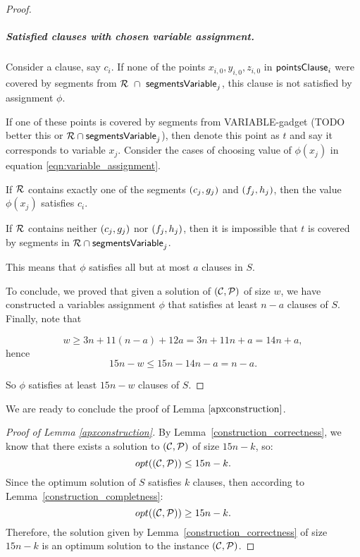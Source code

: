 \begin{proof}
\subparagraph{Satisfied clauses with chosen variable assignment.}

Consider a clause, say $c_i$. If none of
the points $x_{i,0}, y_{i,0}, z_{i,0}$ in $\mathsf{pointsClause}_i$ were covered by
segments from $\mathcal{R}~\cap~\mathsf{segmentsVariable}_{j}$,
this clause is not satisfied by assignment $\phi$.

If one of these points is covered by 
segments from VARIABLE-gadget (TODO better this or $\mathcal{R} \cap \mathsf{segmentsVariable}_{j}$),
then denote this point as $t$ and say it corresponds to variable $x_j$.
Consider the cases of choosing value of $\phi(x_j)$
in equation \eqref{eqn:variable_assignment}.

If $\mathcal{R}$ contains exactly one of the segments $(c_{j}, g_{j})$ and $(f_{j}, h_{j})$,
then the value $\phi(x_j)$ satisfies $c_i$.

If $\mathcal{R}$ contains neither $(c_{j}, g_{j})$ nor $(f_{j}, h_{j})$,
then it is impossible that $t$ is covered by segments in $\mathcal{R} \cap \mathsf{segmentsVariable}_{j}$.

This means that $\phi$ satisfies all but at most $a$ clauses in $S$.


To conclude, we proved that given a solution of $(\mathcal{C}, \mathcal{P})$ of size $w$,
we have constructed a variables assignment $\phi$
that satisfies at least $n-a$ clauses of $S$.
Finally, note that

$$w \ge 3n + 11(n-a) + 12a = 3n + 11n + a = 14n + a,$$
hence
$$15n - w  \le 15n - 14n - a = n - a.$$

So $\phi$ satisfies at least $15n-w$ clauses of $S$.
\end{proof}

We are ready to conclude the proof of Lemma $\ref{apxconstruction}$.

\begin{proof}[Proof of Lemma \ref{apxconstruction}]
By Lemma~\ref{construction_correctness}, we know
that there exists a solution to $(\mathcal{C}, \mathcal{P})$ of size $15n-k$, so: 
$$opt((\mathcal{C}, \mathcal{P})) \le 15n - k.$$
Since the optimum solution of $S$ satisfies $k$ clauses,
then according to Lemma~\ref{construction_completness}:
$$opt((\mathcal{C}, \mathcal{P})) \ge 15n -k.$$
Therefore, the solution given by Lemma~\ref{construction_correctness} 
of size $15n - k$ is an optimum solution to the instance $(\mathcal{C}, \mathcal{P})$.
\end{proof}

